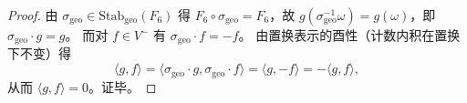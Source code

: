 \begin{proof}
由 \(\sigma_{\mathrm{geo}}\in \mathrm{Stab}_{\mathrm{geo}}(F_6)\) 得 \(F_6\circ\sigma_{\mathrm{geo}}=F_6\)，故 \(g(\sigma_{\mathrm{geo}}^{-1}\omega)=g(\omega)\)，即 \(\sigma_{\mathrm{geo}}\cdot g=g\)。
而对 \(f\in V^-\) 有 \(\sigma_{\mathrm{geo}}\cdot f=-f\)。
由置换表示的酉性（计数内积在置换下不变）得
\[
\langle g,f\rangle=\langle \sigma_{\mathrm{geo}}\cdot g,\sigma_{\mathrm{geo}}\cdot f\rangle=\langle g,-f\rangle=-\langle g,f\rangle,
\]
从而 \(\langle g,f\rangle=0\)。证毕。
\end{proof}

